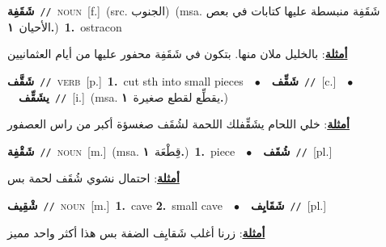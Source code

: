 \documentclass[10pt,a4paper,twoside]{article} %
\begin{document}
\begin{multicols}{2}
{\setlength\topsep{0pt}\textbf{\foreignlanguage{arabic}{شَقَفِة}}\ {\color{gray}\texttt{//}\color{black}}\ \textsc{noun}\ [f.]\ (src. \color{gray}\foreignlanguage{arabic}{الجنوب}\color{black})\ \color{gray}(msa. \foreignlanguage{arabic}{شَقَفِة منبسطة عليها كتابات في بعص الأحيان}~\foreignlanguage{arabic}{\textbf{١.}})\color{black}\ \textbf{1.}~ostracon\  \begin{flushright}\color{gray}\foreignlanguage{arabic}{\textbf{\underline{\foreignlanguage{arabic}{أمثلة}}}: بالخليل ملان منها. بتكون في شَقَفِة محفور عليها من أيام العثمانيين}\end{flushright}\color{black}} \vspace{2mm}

{\setlength\topsep{0pt}\textbf{\foreignlanguage{arabic}{شَقَّف}}\ {\color{gray}\texttt{//}\color{black}}\ \textsc{verb}\ [p.]\ \textbf{1.}~cut sth into small pieces\ \ $\bullet$\ \ \setlength\topsep{0pt}\textbf{\foreignlanguage{arabic}{شَقِّف}}\ {\color{gray}\texttt{//}\color{black}}\ [c.]\ \ $\bullet$\ \ \setlength\topsep{0pt}\textbf{\foreignlanguage{arabic}{يشَقِّف}}\ {\color{gray}\texttt{//}\color{black}}\ [i.]\ \color{gray}(msa. \foreignlanguage{arabic}{يقطِّع لقطع صغيرة}~\foreignlanguage{arabic}{\textbf{١.}})\color{black}\  \begin{flushright}\color{gray}\foreignlanguage{arabic}{\textbf{\underline{\foreignlanguage{arabic}{أمثلة}}}: خلي اللحام يشَقِّفلك اللحمة لشُقَف صغسؤة أكبر من راس العصفور}\end{flushright}\color{black}} \vspace{2mm}

{\setlength\topsep{0pt}\textbf{\foreignlanguage{arabic}{شَقْفِة}}\ {\color{gray}\texttt{//}\color{black}}\ \textsc{noun}\ [m.]\ \color{gray}(msa. \foreignlanguage{arabic}{قِطْعَة}~\foreignlanguage{arabic}{\textbf{١.}})\color{black}\ \textbf{1.}~piece\ \ $\bullet$\ \ \setlength\topsep{0pt}\textbf{\foreignlanguage{arabic}{شُقَف}}\ {\color{gray}\texttt{//}\color{black}}\ [pl.]\  \begin{flushright}\color{gray}\foreignlanguage{arabic}{\textbf{\underline{\foreignlanguage{arabic}{أمثلة}}}: احتمال نشوي شُقَف لحمة بس}\end{flushright}\color{black}} \vspace{2mm}

{\setlength\topsep{0pt}\textbf{\foreignlanguage{arabic}{شْقِيف}}\ {\color{gray}\texttt{//}\color{black}}\ \textsc{noun}\ [m.]\ \textbf{1.}~cave  \textbf{2.}~small cave\ \ $\bullet$\ \ \setlength\topsep{0pt}\textbf{\foreignlanguage{arabic}{شَقَايِف}}\ {\color{gray}\texttt{//}\color{black}}\ [pl.]\  \begin{flushright}\color{gray}\foreignlanguage{arabic}{\textbf{\underline{\foreignlanguage{arabic}{أمثلة}}}: زرنا أغلب شَقايِف الضفة بس هذا أكثر واحد مميز}\end{flushright}\color{black}} \vspace{2mm}


\end{multicols}
\end{document}
